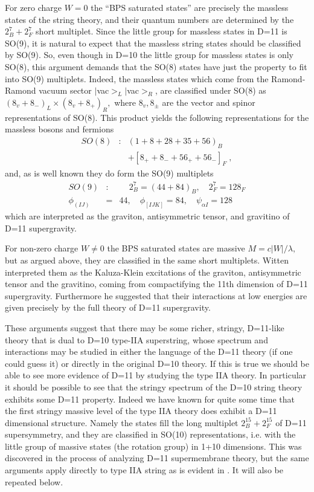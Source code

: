 For zero charge $W=0$ the ``BPS saturated states'' are precisely the
massless states of the string theory, and their quantum numbers are
determined by the $2_B^7+2_F^7$ short multiplet. Since the little group for
massless states in D=11 is SO(9), it is natural to expect that the massless
string states should be classified by SO(9). So, even though in D=10 the
little group for massless states is only SO(8), this argument demands that
the SO(8) states have just the property to fit into SO(9) multiplets.
Indeed, the massless states which come from the Ramond-Ramond vacuum sector $%
|$vac$>_L|$vac$>_R$, are classified under SO(8) as $\left( 8_v+8_{-}\right)
_L\times \left( 8_v+8_{+}\right) _R,$ where $8_v,8_{\pm }$ are the vector
and spinor representations of SO(8). This product yields the following
representations for the massless bosons and fermions
\begin{eqnarray}
SO(8) &:&\left( 1+8+28+35+56\right) _B \\
&&+\left[ 8_{+}+8_{-}+56_{+}+56_{-}\right] _F\;,  \nonumber
\end{eqnarray}
and, as is well known they do form the SO(9) multiplets
\begin{eqnarray}
SO(9) &:&\,\quad 2_B^7=(44+84)_B,\quad 2_F^7=128_F  \label{sugra} \\
\phi _{(IJ)} &=&44,\quad \phi _{[IJK]}=84,\quad \psi _{\alpha I}=128
\nonumber
\end{eqnarray}
which are interpreted as the graviton, antisymmetric tensor, and gravitino
of D=11 supergravity.

For non-zero charge $W\neq 0$ the BPS saturated states are massive $%
M=c\left| W\right| /\lambda ,$ but as argued above, they are classified in
the same short multiplets. Witten interpreted them as the Kaluza-Klein
excitations of the graviton, antisymmetric tensor and the gravitino, coming
from compactifying the 11th dimension of D=11 supergravity. Furthermore he
suggested that their interactions at low energies are given precisely by the
full theory of D=11 supergravity.

These arguments suggest that there may be some richer, stringy, D=11-like
theory that is dual to D=10 type-IIA superstring, whose spectrum and
interactions may be studied in either the language of the D=11 theory (if
one could guess it) or directly in the original D=10 theory. If this is true
we should be able to see more evidence of D=11 by studying the type IIA
theory. In particular it should be possible to see that the stringy spectrum
of the D=10 string theory exhibits some D=11 property. Indeed we have known
for quite some time that the first stringy massive level of the type IIA
theory does exhibit a D=11 dimensional structure\cite{ibmembrane}. Namely
the states fill the long multiplet $2_B^{15}+2_F^{15}$ of D=11
supersymmetry, and they are classified in SO(10) representations, i.e. with
the little group of massive states (the rotation group) in 1+10 dimensions.
This was discovered in the process of analyzing D=11 supermembrane theory,
but the same arguments apply directly to type IIA string as is evident in
\cite{ibmembrane}. It will also be repeated below.

